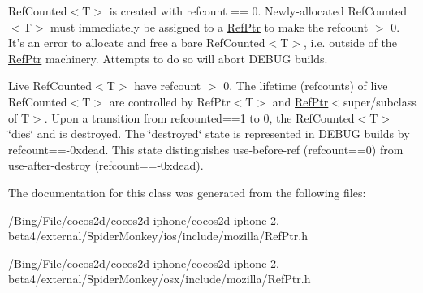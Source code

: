 Ref\-Counted$<$\-T$>$ is created with refcount == 0. Newly-\/allocated Ref\-Counted$<$\-T$>$ must immediately be assigned to a \hyperlink{classmozilla_1_1_ref_ptr}{Ref\-Ptr} to make the refcount $>$ 0. It's an error to allocate and free a bare Ref\-Counted$<$\-T$>$, i.\-e. outside of the \hyperlink{classmozilla_1_1_ref_ptr}{Ref\-Ptr} machinery. Attempts to do so will abort D\-E\-B\-U\-G builds.

Live Ref\-Counted$<$\-T$>$ have refcount $>$ 0. The lifetime (refcounts) of live Ref\-Counted$<$\-T$>$ are controlled by Ref\-Ptr$<$\-T$>$ and \hyperlink{classmozilla_1_1_ref_ptr}{Ref\-Ptr}$<$super/subclass of T$>$. Upon a transition from refcounted==1 to 0, the Ref\-Counted$<$\-T$>$ \char`\"{}dies\char`\"{} and is destroyed. The \char`\"{}destroyed\char`\"{} state is represented in D\-E\-B\-U\-G builds by refcount==-\/0xdead. This state distinguishes use-\/before-\/ref (refcount==0) from use-\/after-\/destroy (refcount==-\/0xdead). 

The documentation for this class was generated from the following files\-:\begin{DoxyCompactItemize}
\item 
/\-Bing/\-File/cocos2d/cocos2d-\/iphone/cocos2d-\/iphone-\/2.-\/beta4/external/\-Spider\-Monkey/ios/include/mozilla/Ref\-Ptr.\-h\item 
/\-Bing/\-File/cocos2d/cocos2d-\/iphone/cocos2d-\/iphone-\/2.-\/beta4/external/\-Spider\-Monkey/osx/include/mozilla/Ref\-Ptr.\-h\end{DoxyCompactItemize}

